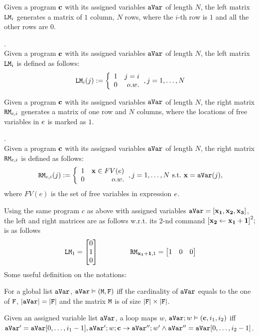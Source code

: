 \documentclass[a4paper,11pt]{article}
\begin{document}
Given a program  $\mathbf{{c}}$ with its assigned variables $\mathtt{aVar}$ of length $N$,
the left matrix $\mathtt{LM}_i$ generates a matrix of $1$ column, $N$ rows, 
where the $i$-th row is $1$ and all the other rows are $0$.
%
\begin{defn}.
\\
Given a program  $\mathbf{{c}}$ with its assigned variables $\mathtt{aVar}$ of length $N$, 
the left matrix $\mathtt{LM}_i$ is defined as follows:
\[
	\lMtrix_i(j) : = 
	\left
	\{
	\begin{array}{lr}
	1 & j = i \\
	0 & o.w.
	\end{array}
	\right.,
	j = 1, \ldots, N
\]
\end{defn}
%
Given a program  $\mathbf{{c}}$ with its assigned variables $\mathtt{aVar}$ of length $N$,
the right matrix $\mathtt{RM}_{e, i}$ generates a matrix of one row and $N$ columns, 
where the locations of free variables in $e$ is marked as $1$. 
%
%
\begin{defn}.
\\
Given a program  $\mathbf{{c}}$ with its assigned variables $\mathtt{aVar}$ of length $N$, 
the right matrix $\mathtt{RM}_{e, i}$ is defined as follows:
\[
	\rMtrix_{\expr, i}(j) : = 
	\left\{
	\begin{array}{lr}
	1 & \ssa{x} \in FV(\expr) 
	\\
	0 & o.w.
	\end{array}
	\right., 
	j = 1, \ldots, N ~ \text{s.t.} ~ \ssa{x} = \avar(j),
\]
where $FV(e)$ is the set of free variables in expression $e$.
%
%
\end{defn}
%
Using the same program $c$ as above with assigned variables $\mathtt{aVar} = [ \mathbf{{x_1 , x_2 , x_3}} ] $,
the left and right matrices are as follows w.r.t. its $2$-nd command 
$\left[\ssa{\assign {x_2} {x_1 + 1}}	\right]^2;$ 
is as follows
\[
\lMtrix_1 = \left[ \begin{matrix}
 0   \\
 1 	 \\
 0  \\
\end{matrix}   \right ] 
~~~~~~~~~~~~~~
\rMtrix_{\ssa{x_1 + 1}, 1}
= \left[ \begin{matrix} 
   1 & 0 & 0 \\
\end{matrix}  \right]
\]
%
Some useful definition on the notations:
\begin{defn}
For a global list $\mathtt{aVar}$, $\mathtt{aVar} \vDash (\mathtt{M},\mathtt{F})$ iff the cardinality of $\mathtt{aVar}$ equals to the one of $\mathtt{F}$, $|\mathtt{aVar}| = |\mathtt{F}|$ 
and the matrix $\mathtt{M}$ is of size $|\mathtt{F}| \times |\mathtt{F}|$.
\end{defn}
%
%
\begin{defn}
Given an assigned variable list $\mathtt{aVar}$, a loop maps $w$, $\mathtt{aVar};w \vDash (\mathbf{{c}},i_1,i_2)$ iff 
$\mathtt{aVar}' = \mathtt{aVar}[0,\ldots, i_1-1], \mathtt{aVar}';w; \mathbf{{c}} \to \mathtt{aVar}'' ; w' \land \mathtt{aVar}'' = \mathtt{aVar}[0, \ldots, i_2-1] $.  
\end{defn}
%
%
\end{document}
